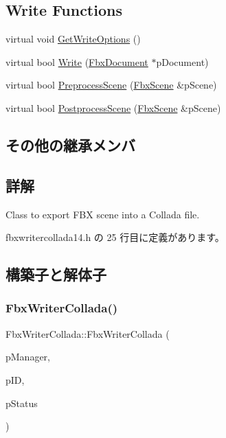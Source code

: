 \subsection*{Write Functions}
\begin{DoxyCompactItemize}
\item 
virtual void \hyperlink{class_fbx_writer_collada_a64fdc18e00335c37acf279a5ef0d3711}{Get\+Write\+Options} ()
\item 
virtual bool \hyperlink{class_fbx_writer_collada_aaf5a632f5fa72c521d578ad17ae0aea1}{Write} (\hyperlink{class_fbx_document}{Fbx\+Document} $\ast$p\+Document)
\item 
virtual bool \hyperlink{class_fbx_writer_collada_aee5b9934adfdd982e0c33373ddf77121}{Preprocess\+Scene} (\hyperlink{class_fbx_scene}{Fbx\+Scene} \&p\+Scene)
\item 
virtual bool \hyperlink{class_fbx_writer_collada_a3f03c5f945df442ecba81efa7d531c64}{Postprocess\+Scene} (\hyperlink{class_fbx_scene}{Fbx\+Scene} \&p\+Scene)
\end{DoxyCompactItemize}
\subsection*{その他の継承メンバ}


\subsection{詳解}
Class to export F\+BX scene into a Collada file. 

 fbxwritercollada14.\+h の 25 行目に定義があります。



\subsection{構築子と解体子}
\mbox{\label{class_fbx_writer_collada_aed549791a8dec6dbeba7a6293c098cdb}} 
\subsubsection{\texorpdfstring{Fbx\+Writer\+Collada()}{FbxWriterCollada()}}
{\footnotesize\ttfamily Fbx\+Writer\+Collada\+::\+Fbx\+Writer\+Collada (\begin{DoxyParamCaption}\item[{\hyperlink{class_fbx_manager}{Fbx\+Manager} \&}]{p\+Manager,  }\item[{int}]{p\+ID,  }\item[{\hyperlink{class_fbx_status}{Fbx\+Status} \&}]{p\+Status }\end{DoxyParamCaption})}

